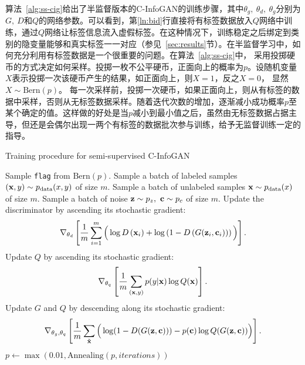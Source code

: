 算法~\ref{alg:ss-cig}给出了半监督版本的C-InfoGAN的训练步骤，其中$\theta_g, ~\theta_d, ~\theta_g$分别为$G, ~D$和$Q$的网络参数。可以看到，第\ref{ln:bid}行直接将有标签数据放入$Q$网络中训练，通过$Q$网络让标签信息流入虚假标签。在这种情况下，训练稳定之后绑定到类别的隐变量能够和真实标签一一对应（参见~\ref{sec:results}节）。在半监督学习中，如何充分利用有标签数据是一个很重要的问题。在算法~\ref{alg:ss-cig}中，
采用投掷硬币的方式决定如何采样。投掷一枚不公平硬币，正面向上的概率为$p$。设随机变量$X$表示投掷一次该硬币产生的结果，如正面向上，则$X=1$，反之$X=0$，
显然$X\sim\text{Bern}(p)$。
每一次采样前，投掷一次硬币，如果正面向上，则从有标签的数据中采样，否则从无标签数据采样。随着迭代次数的增加，逐渐减小成功概率$p$至某个确定的值。这样做的好处是当$p$减小到最小值之后，虽然由无标签数据占据主导，但还是会偶尔出现一两个有标签的数据批次参与训练，给予无监督训练一定的指导。
\begin{algorithm}[htbp]
  \small
  \caption{Training procedure for semi-supervised C-InfoGAN}
  \label{alg:ss-cig}
  \begin{algorithmic}[1]
      \State Sample \texttt{flag} from $\text{Bern}(p)$.
        \State Sample a batch of labeled samples 
               $(\mathbf{x}, y) \sim p_{\text{data}}(x,y)$ of size $m$.
      \Else
        \State Sample a batch of unlabeled samples $\mathbf{x} \sim p_{\text{data}}(x)$ of
        size $m$.
      \EndIf
      \State Sample a batch of noise $\mathbf{z}\sim p_z, ~\mathbf{c}\sim p_c$ of size
      $m$.
      \State Update the discriminator by ascending its stochastic gradient:
      \[
        \nabla_{\theta_d} \left[ 
          \frac{1}{m} \sum_{i=1}^m \Big( 
            \log D\left(\mathbf{x}_i\right) + 
            \log\left( 1 - D\left( G(\mathbf{z}_i, \mathbf{c}_i) \right) \right)
          \Big)
        \right].
      \]
        \State Update $Q$ by ascending its stochastic gradient: \label{ln:bid}
        \[
          \nabla_{\theta_q} \left[ 
            \frac{1}{m} \sum_{(\mathbf{x}, y)} p(y|\mathbf{x}) \log Q(\bf{x}) 
          \right].
        \]
      \EndIf
      \State Update $G$ and $Q$ by descending along its stochastic gradient:
      \[
        \nabla_{\theta_g,\theta_q} \left[ 
          \frac{1}{m} \sum_{\tilde{\mathbf{x}}} \Big(
            \log(1 - D(G(\mathbf{z},\mathbf{c}))) -
            p(\mathbf{c})\log Q(G(\mathbf{z}, \mathbf{c}))
          \Big)
        \right]. \label{ln:test}
      \]
      \State $p \gets \max(0.01, \text{Annealing}(p, iterations))$ 
    \EndFor
  \end{algorithmic}
\end{algorithm}

